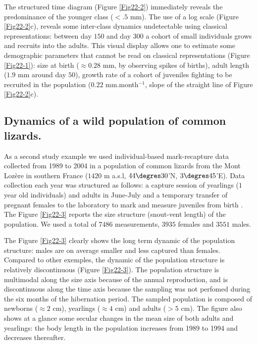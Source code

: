 The structured time diagram (Figure \ref{Fig22-2}) immediately reveals the predominance of the
younger class ($<.5$ mm). The use of a log scale (Figure \ref{Fig22-2}c),
reveals some inter-class dynamics undetectable using classical representations: between day
$150$ and day $300$ a cohort of small individuals grows and recruits into the
adults. This visual display allows one to estimate some demographic parameters
that cannot be read on classical representations (Figure \ref{Fig22-1}): size at
birth ($\approx0.28$ mm, by observing spikes of births), adult length ($1.9$ mm around
day $50$), growth rate of a cohort of juveniles fighting to be recruited in the
population ($0.22$ mm.month$^{-1}$, slope of the straight line of Figure
\ref{Fig22-2}c).

\subsection{Dynamics of a wild population of common lizards.}

As a second study example we used individual-based mark-recapture data collected
from 1989 to 2004 in a population of common lizards from the Mont Lozère in
southern France ($1420$ m a.s.l, $44\degres30$’N, $3\degres45$’E). Data collection
each year was structured as follows: a capture session of yearlings ($1$ year
old individuals) and adults in June-July and a temporary transfer of pregnant females to the
laboratory to mark and measure juveniles from birth \autocite{le-galliard2010a}.
The Figure \ref{Fig22-3} reports the size structure (snout-vent length) of the
population. We used a total of $7486$ measurements, $3935$ females and $3551$
males.

The Figure \ref{Fig22-3} clearly shows the long term dynamic of the population structure:
males are on average smaller and less captured than females. Compared to other
exemples, the dynamic of the population structure is relatively discontinuous
(Figure \ref{Fig22-3}). The population structure is multimodal along the size axis because of
the annual reproduction, and is discontinuous along the time axis because the
sampling was not perfomed during the six months of the hibernation period. The
sampled population is composed of newborns ($\approx2$ cm), yearlings ($\approx4$ cm) and
adults ($>5$ cm). The figure also shows at a glance some secular changes in the
mean size of both adults and yearlings: the body length in the population increases from
1989 to 1994 \autocite{chamaille-jammes2006a} and decreases
thereafter.

